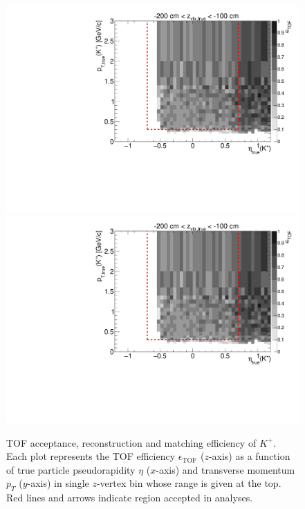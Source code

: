 \begin{figure}[hb]
\caption[TOF acceptance, reconstruction and matching efficiency of $K^{+}$.]{TOF acceptance, reconstruction and matching efficiency of $K^{+}$. Each plot represents the TOF efficiency $\epsilon_{\text{TOF}}$ ($z$-axis) as a function of true particle pseudorapidity $\eta$ ($x$-axis) and transverse momentum $p_{T}$ ($y$-axis) in single $z$-vertex bin whose range is given at the top. Red lines and arrows indicate region accepted in analyses.}\label{fig:tofEff_kaon_plus}
\centering
\parbox{0.495\textwidth}{
  \centering
  \includegraphics[width=\linewidth,page=3]{graphics/eff/Eff2D_TOF_kaon_Plus.pdf}\\
  \includegraphics[width=\linewidth,page=5]{graphics/eff/Eff2D_TOF_kaon_Plus.pdf}\\
}
\end{figure}
